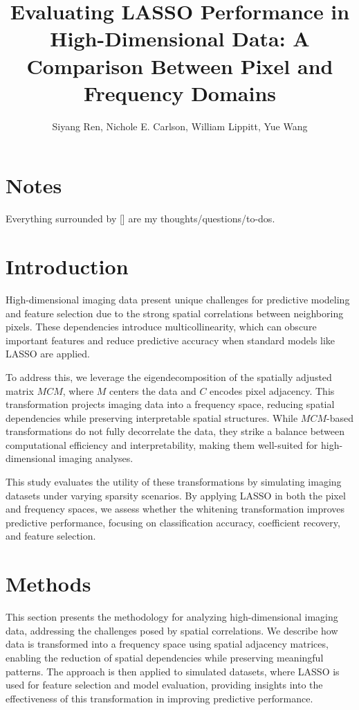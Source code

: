 \documentclass[12pt]{article}
\begin{document}
\title{Evaluating LASSO Performance in High-Dimensional Data: A Comparison Between Pixel and Frequency Domains}
\author{Siyang Ren, Nichole E. Carlson, William Lippitt, Yue Wang}
\date{}
\maketitle


\section*{Notes}

Everything surrounded by [] are my thoughts/questions/to-dos.


\section{Introduction}

High-dimensional imaging data present unique challenges for predictive modeling and feature selection due to the strong spatial correlations between neighboring pixels. These dependencies introduce multicollinearity, which can obscure important features and reduce predictive accuracy when standard models like LASSO are applied.

To address this, we leverage the eigendecomposition of the spatially adjusted matrix \( MCM \), where \( M \) centers the data and \( C \) encodes pixel adjacency. This transformation projects imaging data into a frequency space, reducing spatial dependencies while preserving interpretable spatial structures. While \( MCM \)-based transformations do not fully decorrelate the data, they strike a balance between computational efficiency and interpretability, making them well-suited for high-dimensional imaging analyses.

This study evaluates the utility of these transformations by simulating imaging datasets under varying sparsity scenarios. By applying LASSO in both the pixel and frequency spaces, we assess whether the whitening transformation improves predictive performance, focusing on classification accuracy, coefficient recovery, and feature selection.


\section{Methods}

This section presents the methodology for analyzing high-dimensional imaging data, addressing the challenges posed by spatial correlations. We describe how data is transformed into a frequency space using spatial adjacency matrices, enabling the reduction of spatial dependencies while preserving meaningful patterns. The approach is then applied to simulated datasets, where LASSO is used for feature selection and model evaluation, providing insights into the effectiveness of this transformation in improving predictive performance.
\end{document}
